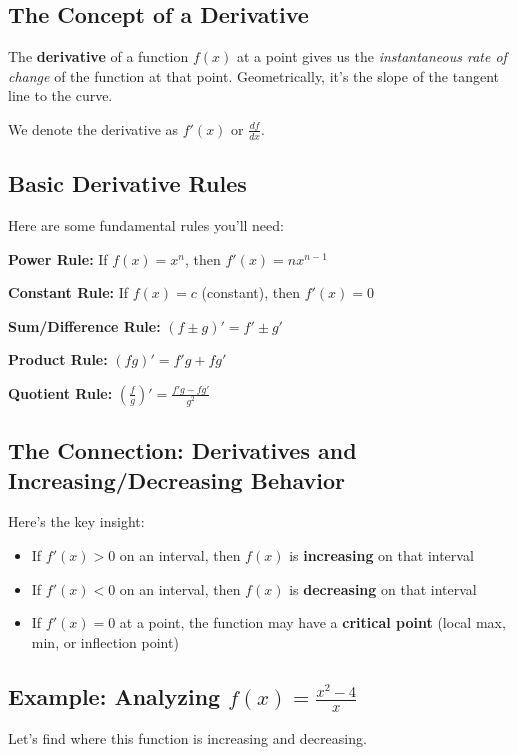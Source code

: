 \documentclass[12pt]{article}
\begin{document}
\subsection{The Concept of a Derivative}

The \textbf{derivative} of a function $f(x)$ at a point gives us the \textit{instantaneous rate of change} of the function at that point. Geometrically, it's the slope of the tangent line to the curve.

We denote the derivative as $f'(x)$ or $\frac{df}{dx}$.

\subsection{Basic Derivative Rules}

Here are some fundamental rules you'll need:

\textbf{Power Rule:} If $f(x) = x^n$, then $f'(x) = nx^{n-1}$

\textbf{Constant Rule:} If $f(x) = c$ (constant), then $f'(x) = 0$

\textbf{Sum/Difference Rule:} $(f \pm g)' = f' \pm g'$

\textbf{Product Rule:} $(fg)' = f'g + fg'$

\textbf{Quotient Rule:} $\left(\frac{f}{g}\right)' = \frac{f'g - fg'}{g^2}$

\subsection{The Connection: Derivatives and Increasing/Decreasing Behavior}

Here's the key insight:
\begin{itemize}
\item If $f'(x) > 0$ on an interval, then $f(x)$ is \textbf{increasing} on that interval
\item If $f'(x) < 0$ on an interval, then $f(x)$ is \textbf{decreasing} on that interval
\item If $f'(x) = 0$ at a point, the function may have a \textbf{critical point} (local max, min, or inflection point)
\end{itemize}

\subsection{Example: Analyzing $f(x) = \frac{x^2 - 4}{x}$}

Let's find where this function is increasing and decreasing.
\end{document}
